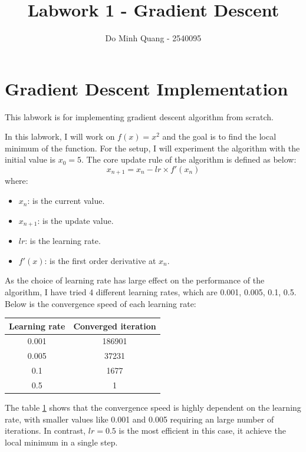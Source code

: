 \documentclass{article}
\title{Labwork 1 - Gradient Descent}
\author{Do Minh Quang - 2540095}
\begin{document}
\maketitle

\section{Gradient Descent Implementation}
This labwork is for implementing gradient descent algorithm from scratch.

In this labwork, I will work on $f(x) = x^2$ and the goal is to find the local minimum of the function. For the setup, I will experiment the algorithm with the initial value is $x_{0} = 5$. The core update rule of the algorithm is defined as below:
\[x_{n+1} = x_{n} - lr \times f'(x_n)\]
where:
\begin{itemize}
    \item $x_{n}$: is the current value.
    \item $x_{n+1}$: is the update value.
    \item $lr$: is the learning rate.
    \item $f'(x)$: is the first order derivative at $x_n$.
\end{itemize}

As the choice of learning rate has large effect on the performance of the algorithm, I have tried 4 different learning rates, which are 0.001, 0.005, 0.1, 0.5. Below is the convergence speed of each learning rate:

\begin{table}[H]
\centering
\label{tab:converge_iter}
\begin{tabular}{|c|c|}
\hline
\textbf{Learning rate} & \textbf{Converged iteration} \\ \hline
0.001                  & 186901                       \\ \hline
0.005                  & 37231                        \\ \hline
0.1                    & 1677                         \\ \hline
0.5                    & 1                            \\ \hline
\end{tabular}
\end{table}

The table \ref{tab:converge_iter} shows that the convergence speed is highly dependent on the learning rate, with smaller values like 0.001 and 0.005 requiring an large number of iterations. In contrast, $lr = 0.5$ is the most efficient in this case, it achieve the local minimum in a single step. 
\end{document}

